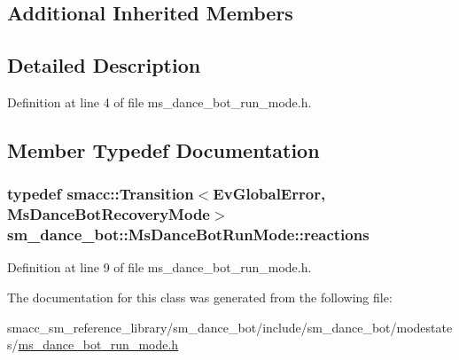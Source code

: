 \subsection*{Additional Inherited Members}


\subsection{Detailed Description}


Definition at line 4 of file ms\+\_\+dance\+\_\+bot\+\_\+run\+\_\+mode.\+h.



\subsection{Member Typedef Documentation}
\subsubsection[{\texorpdfstring{reactions}{reactions}}]{\setlength{\rightskip}{0pt plus 5cm}typedef {\bf smacc\+::\+Transition}$<${\bf Ev\+Global\+Error}, {\bf Ms\+Dance\+Bot\+Recovery\+Mode}$>$ {\bf sm\+\_\+dance\+\_\+bot\+::\+Ms\+Dance\+Bot\+Run\+Mode\+::reactions}}\hypertarget{classsm__dance__bot_1_1MsDanceBotRunMode_a6c0769229c9d5601d25c82c2bead6b33}{}\label{classsm__dance__bot_1_1MsDanceBotRunMode_a6c0769229c9d5601d25c82c2bead6b33}


Definition at line 9 of file ms\+\_\+dance\+\_\+bot\+\_\+run\+\_\+mode.\+h.



The documentation for this class was generated from the following file\+:\begin{DoxyCompactItemize}
\item 
smacc\+\_\+sm\+\_\+reference\+\_\+library/sm\+\_\+dance\+\_\+bot/include/sm\+\_\+dance\+\_\+bot/modestates/\hyperlink{ms__dance__bot__run__mode_8h}{ms\+\_\+dance\+\_\+bot\+\_\+run\+\_\+mode.\+h}\end{DoxyCompactItemize}

